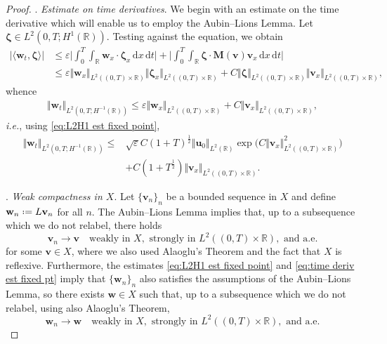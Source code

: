 \documentclass[10pt,a4paper]{amsart}
\newcommand*{\defeq}{\mathrel{\vcenter{\baselineskip0.5ex \lineskiplimit0pt
                     \hbox{\scriptsize.}\hbox{\scriptsize.}}}%
                     =}
\newcommand{\bM}{\mathbf{M}}
\newcommand{\bu}{\mathbf{u}}
\newcommand{\bv}{\mathbf{v}}
\newcommand{\bw}{\mathbf{w}}
\newcommand{\bzeta}{\boldsymbol{\zeta}}
\renewcommand{\d}{\, \mathrm{d}}
\renewcommand{\leq}{\leqslant}
\begin{document}
\begin{proof}
\smallskip 
{}. \textit{Estimate on time derivatives}. We begin with an estimate on the time derivative which will enable us to employ the Aubin--Lions Lemma. Let $\bzeta \in L^2(0,T;H^1(\mathbb{R}))$. Testing against the equation, we obtain 
\begin{equation*}
   \begin{aligned}
       |\langle \bw_t , \bzeta \rangle| &\leq \varepsilon \Big| \int_0^T \int_\mathbb{R} \bw_x \cdot \bzeta_x \d x \d t \Big| + \Big| \int_0^T \int_\mathbb{R} \bzeta \cdot \bM(\bv) \bv_x \d x \d t \Big| \\ 
       &\leq \varepsilon \Vert \bw_x \Vert_{L^2((0,T)\times\mathbb{R})} \Vert \bzeta_x \Vert_{L^2((0,T)\times\mathbb{R})} + C\Vert \bzeta \Vert_{L^2((0,T)\times\mathbb{R})} \Vert \bv_x \Vert_{L^2((0,T)\times\mathbb{R})}, 
   \end{aligned} 
\end{equation*}
whence 
\begin{equation*}
   \begin{aligned}
       \Vert \bw_t \Vert_{L^2(0,T;H^{-1}(\mathbb{R}))} \leq \varepsilon \Vert \bw_x \Vert_{L^2((0,T)\times\mathbb{R})} + C\Vert \bv_x \Vert_{L^2((0,T)\times\mathbb{R})}, 
   \end{aligned} 
\end{equation*}
\textit{i.e.}, using \eqref{eq:L2H1 est fixed point}, 
\begin{equation}\label{eq:time deriv est fixed pt}
   \begin{aligned}
       \Vert \bw_t \Vert_{L^2(0,T;H^{-1}(\mathbb{R}))} \leq &\sqrt{\varepsilon}C(1+T)^{\frac{1}{2}}\Vert \bu_0 \Vert_{L^2(\mathbb{R})} \exp\Big( C \Vert \bv_x \Vert^2_{L^2((0,T)\times\mathbb{R})} \big) \\ 
       &+ C(1+T^{\frac{1}{2}}) \Vert \bv_x \Vert_{L^2((0,T)\times\mathbb{R})}. 
   \end{aligned} 
\end{equation}

\smallskip 
{}. \textit{Weak compactness in $X$}. Let $\{\bv_n\}_n$ be a bounded sequence in $X$ and define $\bw_n  \defeq  L\bv_n$ for all $n$. The Aubin--Lions Lemma implies that, up to a subsequence which we do not relabel, there holds
\begin{equation}
    \bv_n \to \bv \quad \text{weakly in } X, \text{ strongly in } L^2((0,T)\times\mathbb{R}), \text{ and a.e.} 
\end{equation}
for some $\bv \in X$, where we also used Alaoglu's Theorem and the fact that $X$ is reflexive. Furthermore, the estimates \eqref{eq:L2H1 est fixed point} and \eqref{eq:time deriv est fixed pt} imply that $\{\bw_n\}_n$ also satisfies the assumptions of the Aubin--Lions Lemma, so there exists $\bw \in X$ such that, up to a subsequence which we do not relabel, using also Alaoglu's Theorem, 
\begin{equation}\label{eq:conv from aubin lions}
    \bw_n \to \bw \quad \text{weakly in } X, \text{ strongly in } L^2((0,T)\times\mathbb{R}), \text{ and a.e.} 
\end{equation}


\end{proof}
\end{document}
